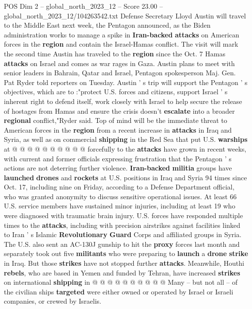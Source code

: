 \begin{textsample}{POS Dim 2 – global\_north\_2023\_12 – Score 23.00 – global\_north\_2023\_12/104263542.txt}  \label{ex:f2_pos_236}
Defense Secretary Lloyd Austin will travel to the Middle East next week, the Pentagon announced, as the Biden administration works to manage a spike in \textbf{Iran-backed} \textbf{attacks} on American forces in the \textbf{region} and contain the Israel-Hamas conflict.
The visit will mark the second time Austin has traveled to the \textbf{region} since the Oct. 7 Hamas \textbf{attacks} on Israel and comes as war rages in Gaza.
Austin plans to meet with senior leaders in Bahrain, Qatar and Israel, Pentagon spokesperson Maj.
Gen.
Pat Ryder told reporters on Tuesday.
Austin ' s trip will support the Pentagon ' s objectives, which are to :"protect U.S. forces and citizens, support Israel ' s inherent right to defend itself, work closely with Israel to help secure the release of hostages from Hamas and ensure the crisis doesn't \textbf{escalate} into a broader \textbf{regional} conflict,"Ryder said.
Top of mind will be the immediate threat to American forces in the \textbf{region} from a recent increase in \textbf{attacks} in Iraq and Syria, as well as on commercial \textbf{shipping} in the Red Sea that put U.S. \textbf{warships} at @ @ @ @ @ @ @ @ @ @ forcefully to the \textbf{attacks} have grown in recent weeks, with current and former officials expressing frustration that the Pentagon ' s actions are not deterring further violence. \textbf{Iran-backed} \textbf{militia} groups have \textbf{launched} \textbf{drones} and \textbf{rockets} at U.S. positions in Iraq and Syria 94 times since Oct. 17, including nine on Friday, according to a Defense Department official, who was granted anonymity to discuss sensitive operational issues.
At least 66 U.S. service members have sustained minor injuries, including at least 19 who were diagnosed with traumatic brain injury.
U.S. forces have responded multiple times to the \textbf{attacks}, including with precision airstrikes against facilities linked to Iran ' s Islamic \textbf{Revolutionary} \textbf{Guard} Corps and affiliated groups in Syria.
The U.S. also sent an AC-130J gunship to hit the \textbf{proxy} forces last month and separately took out five \textbf{militants} who were preparing to \textbf{launch} a \textbf{drone} \textbf{strike} in Iraq.
But those \textbf{strikes} have not stopped further \textbf{attacks}.
Meanwhile, Houthi \textbf{rebels}, who are based in Yemen and funded by Tehran, have increased \textbf{strikes} on international \textbf{shipping} in @ @ @ @ @ @ @ @ @ @ Many -- but not all -- of the civilian ships \textbf{targeted} were either owned or operated by Israel or Israeli companies, or crewed by Israelis.

\end{textsample}
